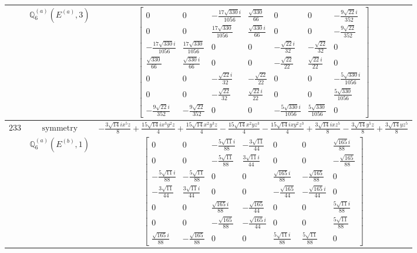 \documentclass[fleqn,8pt,landscape]{jsarticle}
\begin{document}
\begin{longtable}{ccc}
$  $ & $ \mathbb{Q}_{6}^{(a)}(E^{(a)},3) $ & $ \begin{bmatrix} 0 & 0 & - \frac{17 \sqrt{330} i}{1056} & \frac{\sqrt{330}}{66} & 0 & 0 & - \frac{9 \sqrt{22} i}{352} \\ 0 & 0 & \frac{17 \sqrt{330}}{1056} & \frac{\sqrt{330} i}{66} & 0 & 0 & - \frac{9 \sqrt{22}}{352} \\ - \frac{17 \sqrt{330} i}{1056} & \frac{17 \sqrt{330}}{1056} & 0 & 0 & - \frac{\sqrt{22} i}{32} & - \frac{\sqrt{22}}{32} & 0 \\ \frac{\sqrt{330}}{66} & \frac{\sqrt{330} i}{66} & 0 & 0 & - \frac{\sqrt{22}}{22} & \frac{\sqrt{22} i}{22} & 0 \\ 0 & 0 & - \frac{\sqrt{22} i}{32} & - \frac{\sqrt{22}}{22} & 0 & 0 & - \frac{5 \sqrt{330} i}{1056} \\ 0 & 0 & - \frac{\sqrt{22}}{32} & \frac{\sqrt{22} i}{22} & 0 & 0 & \frac{5 \sqrt{330}}{1056} \\ - \frac{9 \sqrt{22} i}{352} & - \frac{9 \sqrt{22}}{352} & 0 & 0 & - \frac{5 \sqrt{330} i}{1056} & \frac{5 \sqrt{330}}{1056} & 0 \end{bmatrix} $ \\ \hline
$ 233 $ & $ \text{symmetry} $ & $ - \frac{3 \sqrt{14} i x^{5} z}{8} + \frac{15 \sqrt{14} i x^{3} y^{2} z}{4} + \frac{15 \sqrt{14} x^{2} y^{3} z}{4} - \frac{15 \sqrt{14} x^{2} y z^{3}}{4} - \frac{15 \sqrt{14} i x y^{2} z^{3}}{4} + \frac{3 \sqrt{14} i x z^{5}}{8} - \frac{3 \sqrt{14} y^{5} z}{8} + \frac{3 \sqrt{14} y z^{5}}{8} $ \\
$  $ & $ \mathbb{Q}_{6}^{(a)}(E^{(b)},1) $ & $ \begin{bmatrix} 0 & 0 & - \frac{5 \sqrt{11} i}{88} & - \frac{3 \sqrt{11}}{44} & 0 & 0 & \frac{\sqrt{165} i}{88} \\ 0 & 0 & - \frac{5 \sqrt{11}}{88} & \frac{3 \sqrt{11} i}{44} & 0 & 0 & - \frac{\sqrt{165}}{88} \\ - \frac{5 \sqrt{11} i}{88} & - \frac{5 \sqrt{11}}{88} & 0 & 0 & \frac{\sqrt{165} i}{88} & - \frac{\sqrt{165}}{88} & 0 \\ - \frac{3 \sqrt{11}}{44} & \frac{3 \sqrt{11} i}{44} & 0 & 0 & - \frac{\sqrt{165}}{44} & - \frac{\sqrt{165} i}{44} & 0 \\ 0 & 0 & \frac{\sqrt{165} i}{88} & - \frac{\sqrt{165}}{44} & 0 & 0 & \frac{5 \sqrt{11} i}{88} \\ 0 & 0 & - \frac{\sqrt{165}}{88} & - \frac{\sqrt{165} i}{44} & 0 & 0 & \frac{5 \sqrt{11}}{88} \\ \frac{\sqrt{165} i}{88} & - \frac{\sqrt{165}}{88} & 0 & 0 & \frac{5 \sqrt{11} i}{88} & \frac{5 \sqrt{11}}{88} & 0 \end{bmatrix} $ \\ \hline

\end{longtable}
\end{document}
